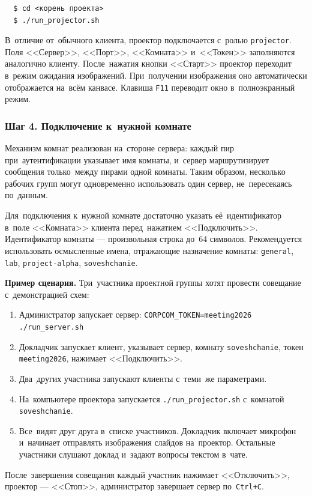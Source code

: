 \begin{verbatim}
  $ cd <корень проекта>
  $ ./run_projector.sh
\end{verbatim}

В~отличие от~обычного клиента, проектор подключается с~ролью \texttt{projector}. Поля <<Сервер>>, <<Порт>>, <<Комната>> и~<<Токен>> заполняются аналогично клиенту. После~нажатия кнопки <<Старт>> проектор переходит в~режим ожидания изображений. При~получении изображения оно автоматически отображается на~всём канвасе. Клавиша \texttt{F11} переводит окно в~полноэкранный режим.

\subsubsection{Шаг 4. Подключение к~нужной комнате}

Механизм комнат реализован на~стороне сервера: каждый пир при~аутентификации указывает имя комнаты, и~сервер маршрутизирует сообщения только~между пирами одной комнаты. Таким образом, несколько рабочих групп могут одновременно использовать один сервер, не~пересекаясь по~данным.

Для~подключения к~нужной комнате достаточно указать её~идентификатор в~поле <<Комната>> клиента перед~нажатием <<Подключить>>. Идентификатор комнаты --- произвольная строка до~64 символов. Рекомендуется использовать осмысленные имена, отражающие назначение комнаты: \texttt{general}, \texttt{lab}, \texttt{project-alpha}, \texttt{soveshchanie}.

\textbf{Пример сценария.} Три~участника проектной группы хотят провести совещание с~демонстрацией схем:

\begin{enumerate}
  \item Администратор запускает сервер: \texttt{CORPCOM\_TOKEN=meeting2026 ./run\_server.sh}
  \item Докладчик запускает клиент, указывает сервер, комнату \texttt{soveshchanie}, токен \texttt{meeting2026}, нажимает <<Подключить>>.
  \item Два~других участника запускают клиенты с~теми~же параметрами.
  \item На~компьютере проектора запускается \texttt{./run\_projector.sh} с~комнатой \texttt{soveshchanie}.
  \item Все~видят друг друга в~списке участников. Докладчик включает микрофон и~начинает отправлять изображения слайдов на~проектор. Остальные участники слушают доклад и~задают вопросы текстом в~чате.
\end{enumerate}

После~завершения совещания каждый участник нажимает <<Отключить>>, проектор --- <<Стоп>>, администратор завершает сервер по~\texttt{Ctrl+C}.


